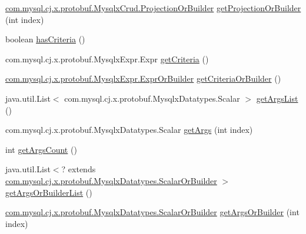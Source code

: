 \begin{DoxyCompactItemize}
\item 
\mbox{\hyperlink{interfacecom_1_1mysql_1_1cj_1_1x_1_1protobuf_1_1_mysqlx_crud_1_1_projection_or_builder}{com.\+mysql.\+cj.\+x.\+protobuf.\+Mysqlx\+Crud.\+Projection\+Or\+Builder}} \mbox{\hyperlink{interfacecom_1_1mysql_1_1cj_1_1x_1_1protobuf_1_1_mysqlx_crud_1_1_find_or_builder_af8361b814038d1c11aac0a1789f22e63}{get\+Projection\+Or\+Builder}} (int index)
\item 
boolean \mbox{\hyperlink{interfacecom_1_1mysql_1_1cj_1_1x_1_1protobuf_1_1_mysqlx_crud_1_1_find_or_builder_acddc7386d630b9a072efa4172dcfdda0}{has\+Criteria}} ()
\item 
com.\+mysql.\+cj.\+x.\+protobuf.\+Mysqlx\+Expr.\+Expr \mbox{\hyperlink{interfacecom_1_1mysql_1_1cj_1_1x_1_1protobuf_1_1_mysqlx_crud_1_1_find_or_builder_a7dbae3a686c482ae6aabbfea4fc8bab1}{get\+Criteria}} ()
\item 
\mbox{\hyperlink{interfacecom_1_1mysql_1_1cj_1_1x_1_1protobuf_1_1_mysqlx_expr_1_1_expr_or_builder}{com.\+mysql.\+cj.\+x.\+protobuf.\+Mysqlx\+Expr.\+Expr\+Or\+Builder}} \mbox{\hyperlink{interfacecom_1_1mysql_1_1cj_1_1x_1_1protobuf_1_1_mysqlx_crud_1_1_find_or_builder_a8307b9f5c0da9c844803f9adea2cc892}{get\+Criteria\+Or\+Builder}} ()
\item 
java.\+util.\+List$<$ com.\+mysql.\+cj.\+x.\+protobuf.\+Mysqlx\+Datatypes.\+Scalar $>$ \mbox{\hyperlink{interfacecom_1_1mysql_1_1cj_1_1x_1_1protobuf_1_1_mysqlx_crud_1_1_find_or_builder_a4ea3ed16d4b6e5e2c4ad3c4c2a350257}{get\+Args\+List}} ()
\item 
com.\+mysql.\+cj.\+x.\+protobuf.\+Mysqlx\+Datatypes.\+Scalar \mbox{\hyperlink{interfacecom_1_1mysql_1_1cj_1_1x_1_1protobuf_1_1_mysqlx_crud_1_1_find_or_builder_a929bcb279226fdfcaeefa7e875f7714e}{get\+Args}} (int index)
\item 
int \mbox{\hyperlink{interfacecom_1_1mysql_1_1cj_1_1x_1_1protobuf_1_1_mysqlx_crud_1_1_find_or_builder_a3a8f98d92f2466b5f9b69de663f0246f}{get\+Args\+Count}} ()
\item 
java.\+util.\+List$<$? extends \mbox{\hyperlink{interfacecom_1_1mysql_1_1cj_1_1x_1_1protobuf_1_1_mysqlx_datatypes_1_1_scalar_or_builder}{com.\+mysql.\+cj.\+x.\+protobuf.\+Mysqlx\+Datatypes.\+Scalar\+Or\+Builder}} $>$ \mbox{\hyperlink{interfacecom_1_1mysql_1_1cj_1_1x_1_1protobuf_1_1_mysqlx_crud_1_1_find_or_builder_aa96c2906705bcd373861d018cf70b13e}{get\+Args\+Or\+Builder\+List}} ()
\item 
\mbox{\hyperlink{interfacecom_1_1mysql_1_1cj_1_1x_1_1protobuf_1_1_mysqlx_datatypes_1_1_scalar_or_builder}{com.\+mysql.\+cj.\+x.\+protobuf.\+Mysqlx\+Datatypes.\+Scalar\+Or\+Builder}} \mbox{\hyperlink{interfacecom_1_1mysql_1_1cj_1_1x_1_1protobuf_1_1_mysqlx_crud_1_1_find_or_builder_a3a54b3ecf72f3a067fe53236d5352098}{get\+Args\+Or\+Builder}} (int index)

\end{DoxyCompactItemize}
